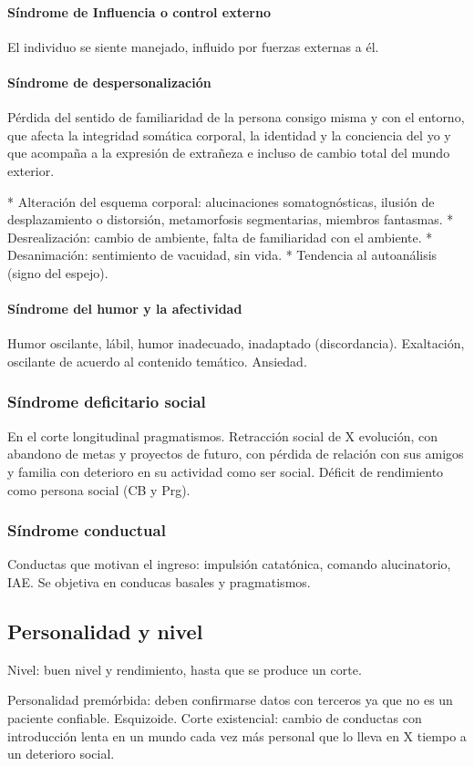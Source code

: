 \paragraph{Síndrome de Influencia o control externo}
El individuo se siente manejado, influido por fuerzas externas a él.
\paragraph{Síndrome de despersonalización}
Pérdida del sentido de familiaridad de la persona consigo misma y con el entorno, que afecta la integridad somática corporal, la identidad y la conciencia del yo y que acompaña a la expresión de extrañeza e incluso de cambio total del mundo exterior.

* Alteración del esquema corporal: alucinaciones somatognósticas, ilusión de desplazamiento o distorsión, metamorfosis segmentarias, miembros fantasmas.
* Desrealización: cambio de ambiente, falta de familiaridad con el ambiente.
* Desanimación: sentimiento de vacuidad, sin vida.
* Tendencia al autoanálisis (signo del espejo).
\paragraph{Síndrome del humor y la afectividad}
Humor oscilante, lábil, humor inadecuado, inadaptado (discordancia). Exaltación, oscilante de acuerdo al contenido temático. Ansiedad.
\subsubsection*{Síndrome deficitario social}
En el corte longitudinal pragmatismos. Retracción social de X evolución, con abandono de metas y proyectos de futuro, con pérdida de relación con sus amigos y familia con deterioro en su actividad como ser social. Déficit de rendimiento como persona social (CB y Prg).
\subsubsection*{Síndrome conductual}
Conductas que motivan el ingreso: impulsión catatónica, comando alucinatorio, IAE. Se objetiva en conducas basales y pragmatismos.
\subsection*{Personalidad y nivel}
Nivel: buen nivel y rendimiento, hasta que se produce un corte.

Personalidad premórbida: deben confirmarse datos con terceros ya que no es un paciente confiable. Esquizoide. Corte existencial: cambio de conductas con introducción lenta en un mundo cada vez más personal que lo lleva en X tiempo a un deterioro social.
